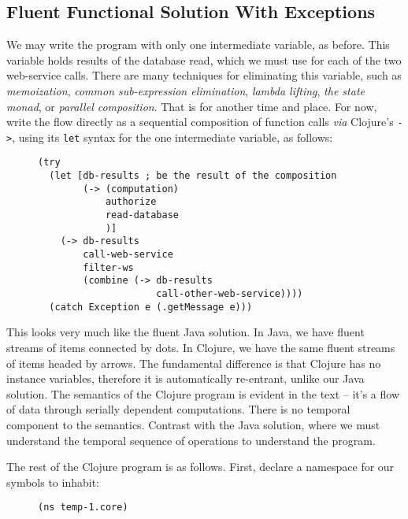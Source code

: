 \documentclass[11pt]{article}
\begin{document}
\subsection{Fluent Functional Solution With Exceptions}
\label{sec-3-1}

We may write the program with only one intermediate variable, as
before. This variable holds results of the database read, which we
must use for each of the two web-service calls. There are many
techniques for eliminating this variable, such as \emph{memoization},
\emph{common sub-expression elimination}, \emph{lambda lifting}, \emph{the state
monad}, or \emph{parallel composition}. That is for another time and
place. For now, write the flow directly as a sequential composition
of function calls \emph{via} Clojure's \verb|->|, using its \verb|let|
syntax for the one intermediate variable, as follows:

\begin{figure}[H]
\label{functional-main-1}
\begin{verbatim}
(try
  (let [db-results ; be the result of the composition
        (-> (computation)
            authorize
            read-database
            )]
    (-> db-results 
        call-web-service
        filter-ws
        (combine (-> db-results
                     call-other-web-service))))
  (catch Exception e (.getMessage e)))
\end{verbatim}
\end{figure}

This looks very much like the fluent Java solution. In Java, we have
fluent streams of items connected by dots. In Clojure, we have the
same fluent streams of items headed by arrows. The fundamental
difference is that Clojure has no instance variables, therefore it
is automatically re-entrant, unlike our Java solution. The semantics
of the Clojure program is evident in the text -- it's a flow of data
through serially dependent computations. There is no temporal
component to the semantics. Contrast with the Java solution, where
we must understand the temporal sequence of operations to
understand the program.

The rest of the Clojure program is as follows. First, declare a
namespace for our symbols to inhabit:

\begin{figure}[H]
\label{functional-helpers-1}
\begin{verbatim}
(ns temp-1.core)
\end{verbatim}
\end{figure}
\end{document}
